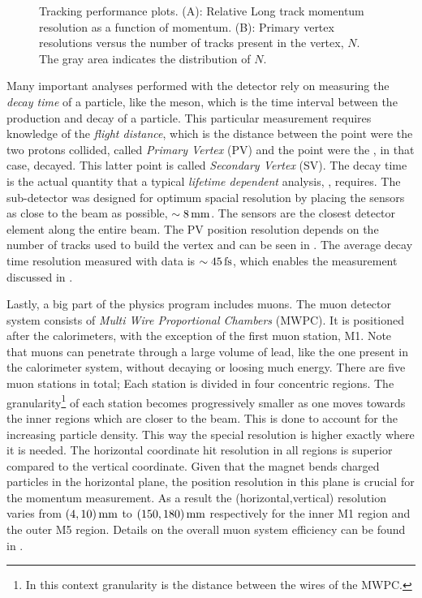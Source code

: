\begin{figure}[t]
\begin{subfigure}{0.5\textwidth}
    \caption{}
    \label{det_velo_pv_res}
  \end{subfigure}
  \caption{Tracking performance plots. (A): Relative Long track momentum resolution as a function of momentum.
          (B): Primary vertex resolutions versus the number of tracks present in the vertex, $N$. The gray area
          indicates the distribution of $N$.}
  \label{det_velo_perf}
\end{figure}

Many important analyses performed with the \lhcb detector rely on measuring the {\it decay time} of a particle,
like the \Bs meson, which is the time interval between the production and decay of a particle.
This particular measurement requires knowledge of the {\it flight distance}, which is the
distance between the point were the two protons collided, called {\it Primary Vertex} (PV) and the point were the
\Bs, in that case, decayed. This latter point is called {\it Secondary Vertex} (SV). The decay time is the actual
quantity that a typical {\it lifetime dependent} analysis, \eg \BsJpsiPhi, requires.
The \velo sub-detector was designed for optimum spacial resolution by placing the \velo sensors as close to the beam
as possible, $\sim 8 \rm \,mm$. The \velo sensors are the closest detector element along the entire \lhc beam.
The PV position resolution depends on the number of tracks used to build the vertex and can
be seen in . The average decay time resolution measured with \BsJpsiPhi data is $\sim 45\rm \,fs$,
which enables the \phis measurement discussed in .

Lastly, a big part of the \lhcb physics program includes muons. The muon detector system consists of {\it Multi Wire Proportional Chambers}
(MWPC). It is positioned after the calorimeters, with the exception of the first muon station, M1.
Note that muons can penetrate through a large volume of lead, like the one present in the calorimeter system,
without decaying or loosing much energy. There are five muon stations in total; Each station is divided in four concentric
regions. The granularity\footnote{In this context granularity is the distance between the wires of the MWPC.}
of each station becomes progressively smaller as one moves towards the inner regions which are closer to the beam.
This is done to account for the increasing particle density. This way the special resolution is higher exactly where
it is needed. The horizontal coordinate hit resolution in all regions is superior compared to the vertical coordinate.
Given that the \lhcb magnet bends charged particles in the horizontal plane, the position resolution in this plane
is crucial for the momentum measurement. As a result the (horizontal,vertical) resolution varies from $(4,10)\rm \,mm$ to
$(150,180)\rm \,mm$ respectively for the inner M1 region and the outer M5 region. Details on the overall muon system
efficiency can be found in \cite{AlvesJr:1492807}.
